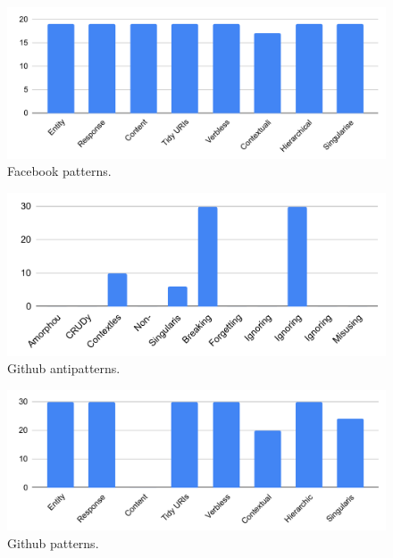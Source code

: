 \documentclass[a4paper,12pt]{article}
\begin{document}
\begin{figure}[!h]
\begin{center}
\includegraphics[keepaspectratio,scale=0.8]{Template_report_LaTeX_EN/img/barchart/facebookBarPatt.pdf}
\caption{Facebook patterns.}
\label{fig:facebookBarPatt}
\end{center}
\end{figure}

\begin{figure}[!h]
\begin{center}
\includegraphics[keepaspectratio,scale=0.8]{Template_report_LaTeX_EN/img/barchart/githubBarAnti.pdf}
\caption{Github antipatterns.}
\label{fig:githubBarAnti}
\end{center}
\end{figure}

\begin{figure}[!h]
\begin{center}
\includegraphics[keepaspectratio,scale=0.8]{Template_report_LaTeX_EN/img/barchart/githubBarPatt.pdf}
\caption{Github patterns.}
\label{fig:githubBarPatt}
\end{center}
\end{figure}
\end{document}
